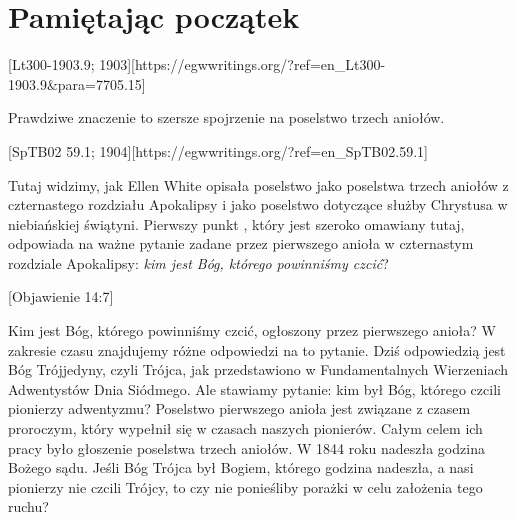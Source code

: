 \chapter{Pamiętając początek} \label{chap:remembering-the-beginning}

[Lt300-1903.9; 1903][https://egwwritings.org/?ref=en\_Lt300-1903.9&para=7705.15]

Prawdziwe znaczenie  to szersze spojrzenie na poselstwo trzech aniołów.

[SpTB02 59.1; 1904][https://egwwritings.org/?ref=en\_SpTB02.59.1]

Tutaj widzimy, jak Ellen White opisała poselstwo  jako poselstwa trzech aniołów z czternastego rozdziału Apokalipsy i jako poselstwo dotyczące służby Chrystusa w niebiańskiej świątyni. Pierwszy punkt , który jest szeroko omawiany tutaj, odpowiada na ważne pytanie zadane przez pierwszego anioła w czternastym rozdziale Apokalipsy: \textit{kim jest Bóg, którego powinniśmy czcić}?

[Objawienie 14:7]

Kim jest Bóg, którego powinniśmy czcić, ogłoszony przez pierwszego anioła? W zakresie czasu znajdujemy różne odpowiedzi na to pytanie. Dziś odpowiedzią jest Bóg Trójjedyny, czyli Trójca, jak przedstawiono w Fundamentalnych Wierzeniach Adwentystów Dnia Siódmego. Ale stawiamy pytanie: kim był Bóg, którego czcili pionierzy adwentyzmu? Poselstwo pierwszego anioła jest związane z czasem proroczym, który wypełnił się w czasach naszych pionierów. Całym celem ich pracy było głoszenie poselstwa trzech aniołów. W 1844 roku nadeszła godzina Bożego sądu. Jeśli Bóg Trójca był Bogiem, którego godzina nadeszła, a nasi pionierzy nie czcili Trójcy, to czy nie ponieśliby porażki w celu założenia tego ruchu?

